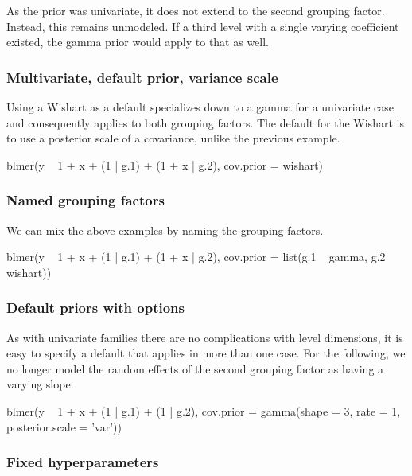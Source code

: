 \documentclass[article,shortnames]{jss}
\begin{document}
As the prior was univariate, it does not extend to the second grouping
factor. Instead, this remains unmodeled. If a third level with a
single varying coefficient existed, the gamma prior would apply to
that as well.

\subsubsection*{Multivariate, default prior, variance scale}

Using a Wishart as a default specializes down to a gamma for a
univariate case and consequently applies to both grouping factors. The
default for the Wishart is to use a posterior scale of a covariance,
unlike the previous example.

\begin{Code}
blmer(y ~ 1 + x + (1 | g.1) + (1 + x | g.2),
      cov.prior = wishart)
\end{Code}

\subsubsection*{Named grouping factors}

We can mix the above examples by naming the grouping factors.

\begin{Code}
blmer(y ~ 1 + x + (1 | g.1) + (1 + x | g.2),
      cov.prior = list(g.1 ~ gamma, g.2 ~ wishart))
\end{Code}

\subsubsection*{Default priors with options}

As with univariate families there are no complications with level
dimensions, it is easy to specify a default that applies in more than
one case. For the following, we no longer model the random effects of
the second grouping factor as having a varying slope.

\begin{Code}
blmer(y ~ 1 + x + (1 | g.1) + (1 | g.2),
      cov.prior = gamma(shape = 3, rate = 1, posterior.scale = 'var'))
\end{Code}

\subsubsection*{Fixed hyperparameters}
\end{document}
